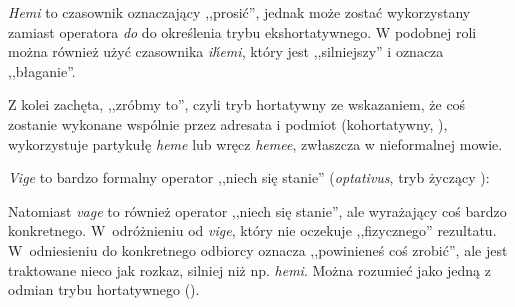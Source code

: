 
\emph{Hemi} to czasownik oznaczający ,,prosić'', jednak może zostać wykorzystany
zamiast operatora \emph{do} do określenia trybu ekshortatywnego. W podobnej roli
można również użyć czasownika \emph{ih́emi}, który jest ,,silniejszy'' i oznacza
,,błaganie''.




Z kolei zachęta, ,,zróbmy to'', czyli tryb hortatywny ze wskazaniem, że coś
zostanie wykonane wspólnie przez adresata i podmiot (kohortatywny, \Chr{}),
wykorzystuje partykułę \emph{heme} lub wręcz \emph{hemee}, zwłaszcza w
nieformalnej mowie.




\emph{Vige} to bardzo formalny operator ,,niech się stanie'' (\emph{optativus},
tryb życzący \Opt{}):


Natomiast \emph{vage} to również operator ,,niech się stanie'', ale wyrażający
coś bardzo konkretnego. W~odróżnieniu od \emph{vige}, który nie
oczekuje ,,fizycznego'' rezultatu. W~odniesieniu do konkretnego odbiorcy
oznacza ,,powinieneś coś zrobić'', ale jest traktowane nieco jak rozkaz,
silniej niż np. \emph{hemi}. Można rozumieć jako jedną z odmian trybu
hortatywnego (\Hort{}).


